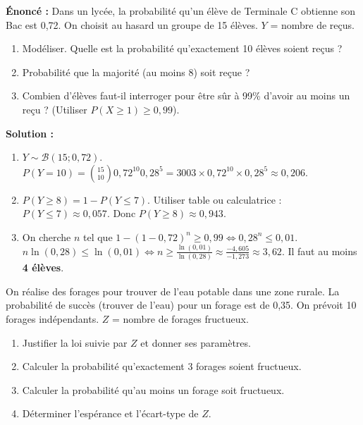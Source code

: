 \documentclass[11pt]{article}
\begin{document}
\begin{exoresolu}
\textbf{Énoncé :} Dans un lycée, la probabilité qu'un élève de Terminale C obtienne son Bac est 0,72. On choisit au hasard un groupe de 15 élèves. $Y$ = nombre de reçus.
\begin{enumerate}
    \item Modéliser. Quelle est la probabilité qu'exactement 10 élèves soient reçus ?
    \item Probabilité que la majorité (au moins 8) soit reçue ?
    \item Combien d'élèves faut-il interroger pour être sûr à 99\% d'avoir au moins un reçu ? (Utiliser $P(X \ge 1) \ge 0,99$).
\end{enumerate}
\textbf{Solution :}
\begin{enumerate}
    \item $Y \sim \mathcal{B}(15; 0,72)$.
    $P(Y=10) = \binom{15}{10} 0,72^{10} 0,28^5 = 3003 \times 0,72^{10} \times 0,28^5 \approx 0,206$.
    \item $P(Y \ge 8) = 1 - P(Y \le 7)$. Utiliser table ou calculatrice : $P(Y \le 7) \approx 0,057$. Donc $P(Y \ge 8) \approx 0,943$.
    \item On cherche $n$ tel que $1 - (1-0,72)^n \ge 0,99 \iff 0,28^n \le 0,01$.
    $n \ln(0,28) \le \ln(0,01) \iff n \ge \frac{\ln(0,01)}{\ln(0,28)} \approx \frac{-4,605}{-1,273} \approx 3,62$.
    Il faut au moins \textbf{4 élèves}.
\end{enumerate}
\end{exoresolu}

\begin{exercice}
On réalise des forages pour trouver de l'eau potable dans une zone rurale. La probabilité de succès (trouver de l'eau) pour un forage est de 0,35. On prévoit 10 forages indépendants. $Z$ = nombre de forages fructueux.
\begin{enumerate}
    \item Justifier la loi suivie par $Z$ et donner ses paramètres.
    \item Calculer la probabilité qu'exactement 3 forages soient fructueux.
    \item Calculer la probabilité qu'au moins un forage soit fructueux.
    \item Déterminer l'espérance et l'écart-type de $Z$.
\end{enumerate}
\end{exercice}
\end{document}
